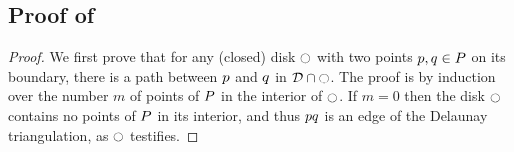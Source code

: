 \documentclass[12pt]{article}%
\begin{document}
\subsection{Proof of }

%
{%
   \ClaimDelConnected{}
}

\begin{proof}
    We first prove that for any (closed) disk $\ocircle$ with two points
    $p,q\in P$ on its boundary, there is a path between $p$
    and $q$ in $\mathcal{D} \cap {\ocircle}$.  The proof is by induction
    over the number $m$ of points of $P$ in the interior of $\ocircle$.
    If $m=0$ then the disk $\ocircle$ contains no points of $P$ in its
    interior, and thus $p q$ is an edge of the Delaunay
    triangulation, as $\ocircle$ testifies.


\end{proof}
\end{document}
